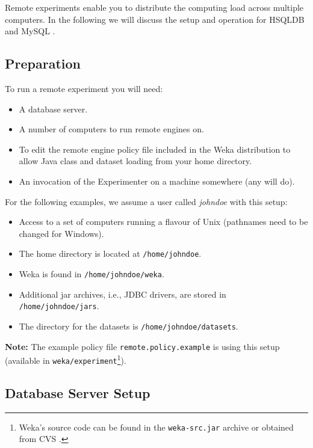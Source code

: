 \documentclass[a4paper]{article}
\begin{document}
Remote experiments enable you to distribute the computing load across multiple computers. In the following we will discuss the setup and operation for HSQLDB \cite{hsql} and MySQL \cite{mysql}.

\subsection{Preparation}

To run a remote experiment you will need:

\begin{itemize}
   \item A database server.
   \item A number of computers to run remote engines on.
   \item To edit the remote engine policy file included in the Weka distribution to allow Java class and dataset loading from your home directory.
   \item An invocation of the Experimenter on a machine somewhere (any will do).
\end{itemize}

\noindent For the following examples, we assume a user called \textit{johndoe} with this setup:

\begin{itemize}
	\item Access to a set of computers running a flavour of Unix (pathnames need to be changed for Windows).
   \item The home directory is located at \texttt{/home/johndoe}.
   \item Weka is found in \texttt{/home/johndoe/weka}.
   \item Additional jar archives, i.e., JDBC drivers, are stored in \texttt{/home/johndoe/jars}.
   \item The directory for the datasets is \texttt{/home/johndoe/datasets}.
\end{itemize}

\noindent \textbf{Note:} The example policy file \texttt{remote.policy.example} is using this setup (available in \texttt{weka/experiment}\footnote{Weka's source code can be found in the \texttt{weka-src.jar} archive or obtained from CVS \cite{cvs}.}).

\subsection{Database Server Setup}
\end{document}
